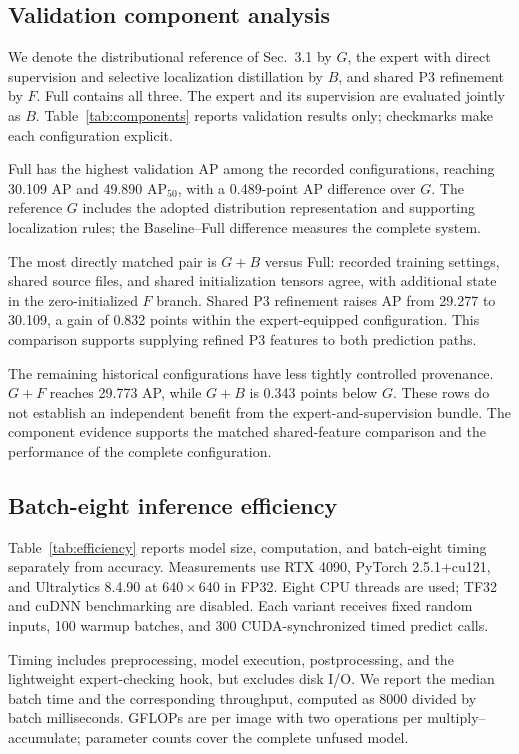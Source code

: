 \subsection{Validation component analysis}
We denote the distributional reference of Sec.~3.1 by $G$, the expert with direct supervision and selective localization distillation by $B$, and shared P3 refinement by $F$. Full contains all three. The expert and its supervision are evaluated jointly as $B$. Table~\ref{tab:components} reports validation results only; checkmarks make each configuration explicit.


Full has the highest validation AP among the recorded configurations, reaching 30.109 AP and 49.890 $\mathrm{AP}_{50}$, with a 0.489-point AP difference over $G$. The reference $G$ includes the adopted distribution representation and supporting localization rules; the Baseline--Full difference measures the complete system.

The most directly matched pair is $G+B$ versus Full: recorded training settings, shared source files, and shared initialization tensors agree, with additional state in the zero-initialized $F$ branch. Shared P3 refinement raises AP from 29.277 to 30.109, a gain of 0.832 points within the expert-equipped configuration. This comparison supports supplying refined P3 features to both prediction paths.

The remaining historical configurations have less tightly controlled provenance. $G+F$ reaches 29.773 AP, while $G+B$ is 0.343 points below $G$. These rows do not establish an independent benefit from the expert-and-supervision bundle. The component evidence supports the matched shared-feature comparison and the performance of the complete configuration.

\subsection{Batch-eight inference efficiency}
Table~\ref{tab:efficiency} reports model size, computation, and batch-eight timing separately from accuracy. Measurements use RTX 4090, PyTorch 2.5.1+cu121, and Ultralytics 8.4.90 at $640\times640$ in FP32. Eight CPU threads are used; TF32 and cuDNN benchmarking are disabled. Each variant receives fixed random inputs, 100 warmup batches, and 300 CUDA-synchronized timed predict calls.

Timing includes preprocessing, model execution, postprocessing, and the lightweight expert-checking hook, but excludes disk I/O. We report the median batch time and the corresponding throughput, computed as 8000 divided by batch milliseconds. GFLOPs are per image with two operations per multiply--accumulate; parameter counts cover the complete unfused model.

